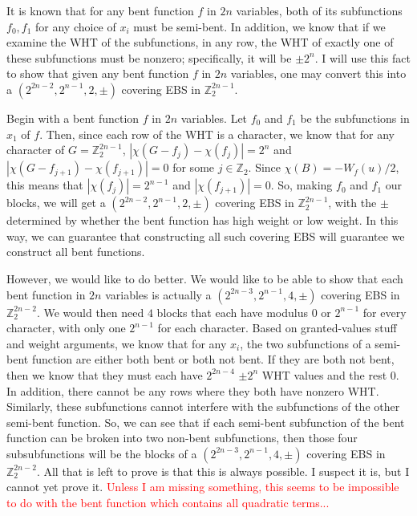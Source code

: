\documentclass[12pt]{amsart}
\newcommand{\Z}{\mathbb{Z}}
\begin{document}
\bigskip

It is known that for any bent function $f$ in $2n$ variables, both of its subfunctions $f_0,f_1$ for any choice of $x_i$ must be semi-bent.  In addition, we know that if we examine the WHT of the subfunctions, in any row, the WHT of exactly one of these subfunctions must be nonzero; specifically, it will be $\pm 2^n$.  I will use this fact to show that given any bent function $f$ in $2n$ variables, one may convert this into a $(2^{2n-2},2^{n-1},2,\pm)$ covering EBS in $\Z_2^{2n-1}$.

\bigskip

Begin with a bent function $f$ in $2n$ variables.  Let $f_0$ and $f_1$ be the subfunctions in $x_1$ of $f$.  Then, since each row of the WHT is a character, we know that for any character of $G=\Z_2^{2n-1}$, $|\chi(G-f_j) - \chi(f_j)| = 2^n$ and $|\chi(G-f_{j+1}) - \chi(f_{j+1})| = 0$ for some $j \in \Z_2$.  Since $\chi(B) = -W_{f}(u)/2$, this means that $|\chi(f_j)| = 2^{n-1}$ and $|\chi(f_{j+1})| = 0$.  So, making $f_0$ and $f_1$ our blocks, we will get a $(2^{2n-2},2^{n-1},2,\pm)$ covering EBS in $\Z_2^{2n-1}$, with the $\pm$ determined by whether the bent function has high weight or low weight.  In this way, we can guarantee that constructing all such covering EBS will guarantee we construct all bent functions.

\newpage

However, we would like to do better.  We would like to be able to show that each bent function in $2n$ variables is actually a $(2^{2n-3},2^{n-1},4,\pm)$ covering EBS in $\Z_2^{2n-2}$.  We would then need $4$ blocks that each have modulus $0$ or $2^{n-1}$ for every character, with only one $2^{n-1}$ for each character.  Based on granted-values stuff and weight arguments, we know that for any $x_i$, the two subfunctions of a semi-bent function are either both bent or both not bent.  If they are both not bent, then we know that they must each have $2^{2n-4}$ $\pm 2^n$ WHT values and the rest $0$.  In addition, there cannot be any rows where they both have nonzero WHT.  Similarly, these subfunctions cannot interfere with the subfunctions of the other semi-bent function.  So, we can see that if each semi-bent subfunction of the bent function can be broken into two non-bent subfunctions, then those four subsubfunctions will be the blocks of a $(2^{2n-3},2^{n-1},4,\pm)$ covering EBS in $\Z_2^{2n-2}$.  All that is left to prove is that this is always possible.  I suspect it is, but I cannot yet prove it.  \textcolor{red}{Unless I am missing something, this seems to be impossible to do with the bent function which contains all quadratic terms...}
\end{document}
